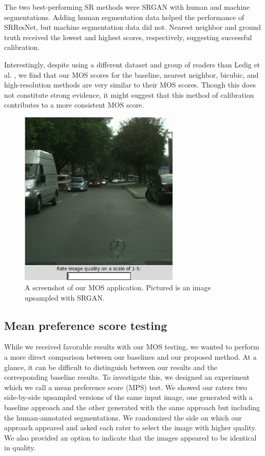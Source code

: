 \documentclass[10pt,twocolumn,letterpaper]{article}
\begin{document}
The two best-performing SR methods were SRGAN with human and machine
segmentations. Adding human segmentation data helped the performance of
SRResNet, but machine segmentation data did not. Nearest neighbor and ground
truth received the lowest and highest scores, respectively, suggesting
successful calibration.

Interestingly, despite using a different dataset and group of readers than
Ledig et al. \cite{SRGAN}, we find that our MOS scores for the baseline,
nearest neighbor, bicubic, and high-resolution methods are very similar to
their MOS scores. Though this does not constitute strong evidence, it might
suggest that this method of calibration contributes to a more consistent MOS
score.

\begin{figure}
    \begin{center}
        \includegraphics[trim=0 0 0 0, clip,
            width=3in]{images/mos.png}
    \end{center}
    \caption{A screenshot of our MOS application. Pictured is an image
    upsampled with SRGAN.}
\end{figure}

\subsection{Mean preference score testing}
While we received favorable results with our MOS testing, we wanted to perform
a more direct comparison between our baselines and our proposed method. At a
glance, it can be difficult to distinguish between our results and the
corresponding baseline results. To investigate this, we designed an experiment
which we call a mean preference score (MPS) test. We showed our raters two
side-by-side upsampled versions of the same input image, one generated with a
baseline approach and the other generated with the same approach but including
the human-annotated segmentations. We randomized the side on which our approach
appeared and asked each rater to select the image with higher quality. We also
provided an option to indicate that the images appeared to be identical in
quality.
\end{document}
